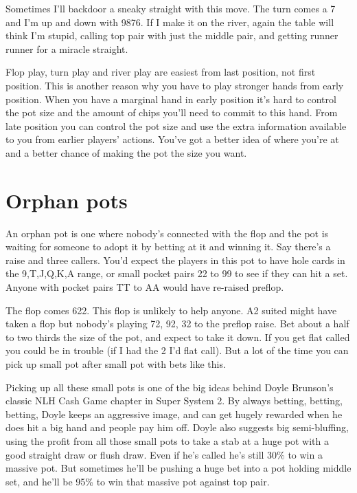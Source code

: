 Sometimes I'll backdoor a sneaky straight with this move. The turn comes
a 7 and I'm up and down with 9876. If I make it on the river,
again the table will think I'm stupid, calling top pair with just the
middle pair, and getting runner runner for a miracle straight.

Flop play, turn play and river play are easiest from last position, not
first position. This is another reason why you have to play stronger hands
from early position. When you have a marginal hand in early position
it's hard to control the pot size and the amount of chips
you'll need to commit to this hand. From late position you can control
the pot size and use the extra information available to you from
earlier players' actions. You've got a better idea of where you're at
and a better chance of making the pot the size you want.

\section{Orphan pots}

An orphan pot is one where nobody's connected with the flop and the
pot is waiting for someone to adopt it by betting at it and winning
it. Say there's a raise and three callers. You'd expect the players in
this pot to have hole cards in the 9,T,J,Q,K,A range, or small
pocket pairs 22 to 99 to see if they can hit a set. Anyone with pocket
pairs TT to AA would have re-raised preflop.

The flop comes 622. This flop is unlikely to help anyone.
A2 suited might have taken a flop but nobody's playing 72, 92, 32 to the
preflop raise. Bet about a half to two thirds the size of the pot,
and expect to take it down. If you get flat called you could
be in trouble (if I had the 2 I'd flat call).
But a lot of the time you can pick up small pot after small pot
with bets like this.

Picking up all these small pots is one of the big ideas behind
Doyle Brunson's classic NLH Cash Game chapter in Super System 2.
By always betting, betting, betting, Doyle keeps an aggressive image,
and can get hugely rewarded when he does hit a big hand and people
pay him off. Doyle also suggests big semi-bluffing, using the
profit from all those small pots to take a stab at a huge pot
with a good straight draw or flush draw. Even if he's called
he's still 30\% to win a massive pot. But sometimes he'll be
pushing a huge bet into a pot holding middle set, and he'll be
95\% to win that massive pot against top pair.


